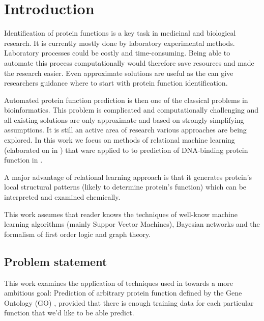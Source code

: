 \documentclass[11pt,twoside,a4paper]{book}
\begin{document}
\chapter{Introduction}
Identification of protein functions is a key task in medicinal and biological research.
It is currently mostly done by laboratory experimental methods.
Laboratory processes could be costly and time-consuming. 
Being able to automate this process computationally would therefore save resources
and made the research easier.
Even approximate solutions are useful as the can give researchers guidance where
to start with protein function identification.

Automated protein function prediction is then one of the classical problems in bioinformatics. 
This problem is complicated and computationally challenging and all existing solutions
are only approximate and based on strongly simplifying assumptions.
It is still an active area of research various approaches are being explored. 
In this work we focus on methods of relational machine learning (elaborated on in \cite{kuzelka}\cite{relf})
that ware applied to to prediction of DNA-binding protein function in \cite{szabova}.

A major advantage of relational learning approach is that it generates protein's local structural patterns
(likely to determine protein's function) which can be interpreted and examined chemically.

This work assumes that reader knows
the techniques of well-know machine learning algorithms (mainly Suppor Vector Machines),
Bayesian networks
and the formalism of first order logic and graph theory.

\section{Problem statement}

This work examines the application of techniques used in \cite{szabova} towards a more ambitious goal:
Prediction of arbitrary protein function
defined by the Gene Ontology (GO) \cite{go}\cite{gores},
provided that there is enough training data for each particular function that we'd like to be able predict.
\end{document}
